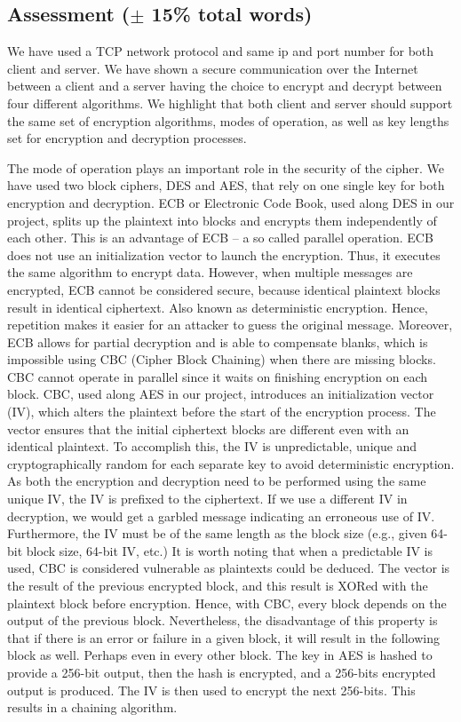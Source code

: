 \subsection{Assessment ($\pm$ 15\% total words)}

We have used a TCP network protocol and same ip and port number for both client and server. We have shown a secure communication over the Internet between a client and a server having the choice to encrypt and decrypt between four different algorithms. We highlight that both client and server should support the same set of encryption algorithms, modes of operation, as well as key lengths set for encryption and decryption processes. 

The mode of operation plays an important role in the security of the cipher. We have used two block ciphers, DES and AES, that rely on one single key for both encryption and decryption. ECB or Electronic Code Book, used along DES in our project, splits up the plaintext into blocks and encrypts them independently of each other. This is an advantage of ECB – a so called parallel operation. ECB does not use an initialization vector to launch the encryption. Thus, it executes the same algorithm to encrypt data. However, when multiple messages are encrypted, ECB cannot be considered secure, because identical plaintext blocks result in identical ciphertext. Also known as deterministic encryption. Hence, repetition makes it easier for an attacker to guess the original message. Moreover, ECB allows for partial decryption and is able to compensate blanks, which is impossible using CBC (Cipher Block Chaining) when there are missing blocks. CBC cannot operate in parallel since it waits on finishing encryption on each block. CBC, used along AES in our project, introduces an initialization vector (IV), which alters the plaintext before the start of the encryption process. The vector ensures that the initial ciphertext blocks are different even with an identical plaintext. To accomplish this, the IV is unpredictable, unique and cryptographically random for each separate key to avoid deterministic encryption. As both the encryption and decryption need to be performed using the same unique IV, the IV is prefixed to the ciphertext. If we use a different IV in decryption, we would get a garbled message indicating an erroneous use of IV. Furthermore, the IV must be of the same length as the block size (e.g., given 64-bit block size, 64-bit IV, etc.) It is worth noting that when a predictable IV is used, CBC is considered vulnerable as plaintexts could be deduced. The vector is the result of the previous encrypted block, and this result is XORed with the plaintext block before encryption. Hence, with CBC, every block depends on the output of the previous block. Nevertheless, the disadvantage of this property is that if there is an error or failure in a given block, it will result in the following block as well. Perhaps even in every other block. The key in AES is hashed to provide a 256-bit output, then the hash is encrypted, and a 256-bits encrypted output is produced. The IV is then used to encrypt the next 256-bits. This results in a chaining algorithm.
